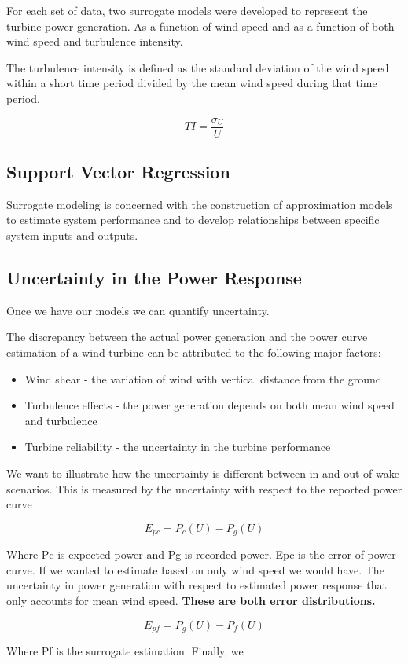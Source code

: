 \documentclass[12pt, a4paper]{report}
\begin{document}
  For each set of data, two surrogate models were developed to represent the turbine power generation. As a function of wind speed and as a function of both wind speed and turbulence intensity.

  The turbulence intensity is defined as the standard deviation of the wind speed within a short time period divided by the mean wind speed during that time period.

  \begin{equation}
    TI = \frac{\sigma_U}{U}
  \end{equation}

  \subsection{Support Vector Regression}

  Surrogate modeling is concerned with the construction of approximation models to estimate system performance and to develop relationships between specific system inputs and outputs.

  \subsection{Uncertainty in the Power Response}

  Once we have our models we can quantify uncertainty.

  The discrepancy between the actual power generation and the power curve estimation of a wind turbine can be attributed to the following major factors:

  \begin{itemize}
    \item Wind shear - the variation of wind with vertical distance from the ground
    \item Turbulence effects - the power generation depends on both mean wind speed and turbulence
    \item Turbine reliability - the uncertainty in the turbine performance
  \end{itemize}

  We want to illustrate how the uncertainty is different between in and out of wake scenarios. This is measured by the uncertainty with respect to the reported power curve

  \begin{equation}
    E_{pc} = P_c(U) - P_g(U)
  \end{equation}

  Where Pc is expected power and Pg is recorded power. Epc is the error of power curve. If we wanted to estimate based on only wind speed we would have. The uncertainty in power generation with respect to estimated power response that only accounts for mean wind speed. \textbf{These are both error distributions.}

  \begin{equation}
    E_{pf} = P_g(U) - P_f(U)
  \end{equation}

  Where Pf is the surrogate estimation. Finally, we
\end{document}
